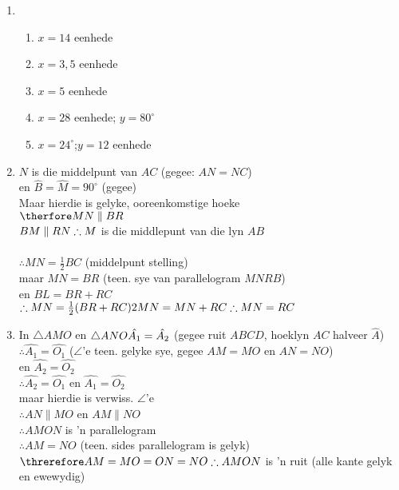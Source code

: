 \begin{solutions}{}{
\begin{enumerate}[itemsep=5pt, label=\textbf{\arabic*}. ] 


\item 
	    \begin{enumerate}[noitemsep, label=\textbf{(\alph*)} ]
		\item$x=14$ eenhede
\item$x=3,5$ eenhede
\item$x=5$ eenhede
\item$x=28$ eenhede; $y=80^{\circ}$
\item$x=24^{\circ}$;$y=12$ eenhede
	    \end{enumerate}
\item $N$ is die middelpunt van $AC$ (gegee: $AN=NC$)\\
en $\hat{B} = \hat{M} = 90^\circ$ (gegee)\\
Maar hierdie is gelyke, ooreenkomstige hoeke\\
$\therfore MN \parallel BR$\\
$BM \parallel RN\\
\therefore M$ is die middlepunt van die lyn $AB$\\
\\
$\therefore MN = \frac{1}{2} BC$ (middelpunt stelling)\\
maar $MN=BR$ (teen. sye van parallelogram $MNRB$)\\
en $BL = BR+RC$\\
$\therefore MN = \frac{1}{2}(BR + RC)\\
2MN = MN + RC\\
\therefore MN=RC$
\item %
In $\triangle AMO$ en $\triangle ANO\\
\hat{A_1} = \hat{A_2}$ (gegee ruit $ABCD$, hoeklyn $AC$ halveer $\hat{A}$)\\
$\therefore \hat{A_1} = \hat{O_1}$ ($\angle$'e teen. gelyke sye, gegee $AM=MO$ en $AN=NO$)\\
en $\hat{A_2} = \hat{O_2}$\\
$\therefore \hat{A_2} = \hat{O_1}$ en $\hat{A_1} = \hat{O_2}$\\
maar hierdie is verwiss. $\angle$'e\\
$\therefore AN \parallel MO$ en $AM \parallel NO$\\
$\therefore AMON$ is 'n parallelogram\\
$\therefore AM = NO$ (teen. sides parallelogram is gelyk)\\
$\threrefore AM=MO=ON=NO\\
\therefore AMON$ is 'n ruit (alle kante gelyk en ewewydig)

\end{enumerate}}
\end{solutions}


